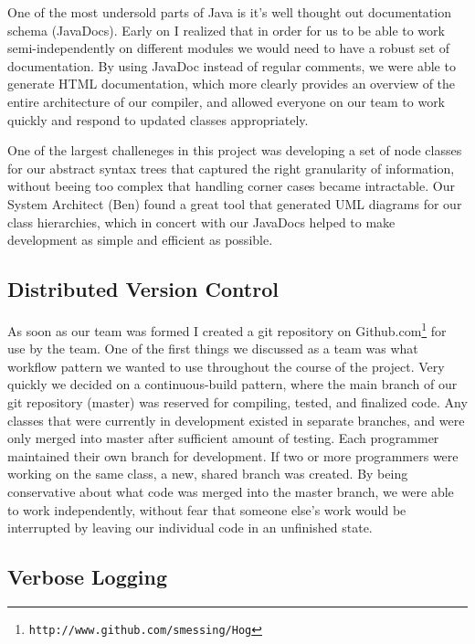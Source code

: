 \documentclass{book}
\begin{document}
One of the most undersold parts of Java is it's well thought out documentation
schema (JavaDocs). Early on I realized that in order for us to be able to work
semi-independently on different modules we would need to have a robust set of
documentation. By using JavaDoc instead of regular comments, we were able to
generate HTML documentation, which more clearly provides an overview of the entire
architecture of our compiler, and allowed everyone on our team to work quickly and
respond to updated classes appropriately.

One of the largest challeneges in this project was developing a set of node classes
for our abstract syntax trees that captured the right granularity of information,
without beeing too complex that handling corner cases became intractable. Our
System Architect (Ben) found a great tool that generated UML diagrams for our
class hierarchies, which in concert with our JavaDocs helped to make development
as simple and efficient as possible. 

\subsection{Distributed Version Control}

As soon as our team was formed I created a git repository on
Github.com\footnote{\texttt{http://www.github.com/smessing/Hog}} for use by the
team. One of the first things we discussed as a team was what workflow pattern
we wanted to use throughout the course of the project. Very quickly we decided
on a continuous-build pattern, where the main branch of our git repository 
(master) was reserved for compiling, tested, and finalized code. Any classes
that were currently in development existed in separate branches, and were only
merged into master after sufficient amount of testing. Each programmer maintained
their own branch for development. If two or more programmers were working on the
same class, a new, shared branch was created. By being conservative about what
code was merged into the master branch, we were able to work independently, without
fear that someone else's work would be interrupted by leaving our individual code
in an unfinished state. 

\subsection{Verbose Logging}
\end{document}
